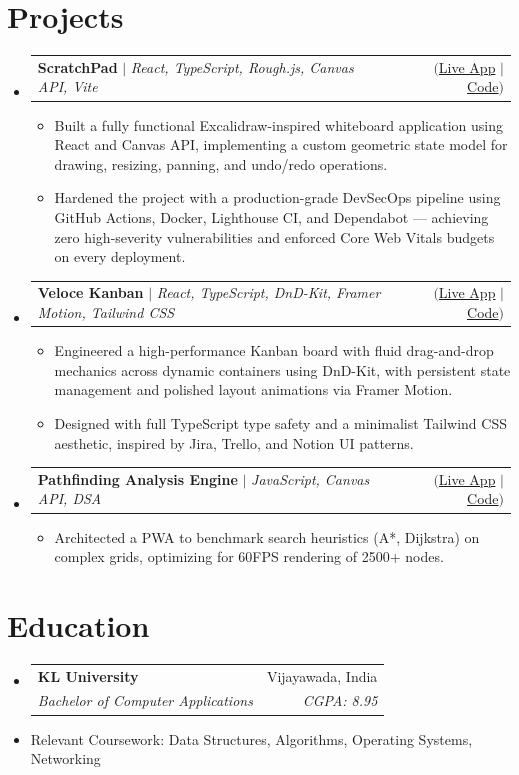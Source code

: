 \documentclass[letterpaper,11pt]{article}
\makeatletter
\newcommand{\resumeItem}[1]{
  \item\small{
    {#1 \vspace{-2pt}}
  }
}
\newcommand{\resumeSubheading}[4]{
  \vspace{-2pt}\item
    \begin{tabular*}{0.97\textwidth}[t]{l@{\extracolsep{\fill}}r}
      \textbf{#1} & #2 \\
      \textit{\small#3} & \textit{\small #4} \\
    \end{tabular*}\vspace{-7pt}
}
\newcommand{\resumeProjectHeading}[2]{
    \item
    \begin{tabular*}{0.97\textwidth}{l@{\extracolsep{\fill}}r}
      \small#1 & #2 \\
    \end{tabular*}\vspace{-7pt}
}
\newcommand{\resumeSubHeadingListStart}{\begin{itemize}[leftmargin=0.15in, label={}]}
\newcommand{\resumeSubHeadingListEnd}{\end{itemize}}
\newcommand{\resumeItemListStart}{\begin{itemize}}
\newcommand{\resumeItemListEnd}{\end{itemize}\vspace{-5pt}}
\makeatother
\begin{document}
\section{Projects}
    \resumeSubHeadingListStart
      \resumeProjectHeading
          {\textbf{ScratchPad} $|$ \emph{React, TypeScript, Rough.js, Canvas API, Vite}}{$(${\href{https://scratchpad.yeshwanth.online}{Live App}} $|$ {\href{https://github.com/yeshwanth-kr/scratchpad}{Code}}$)$}
          \resumeItemListStart
            \resumeItem{Built a fully functional Excalidraw-inspired whiteboard application using React and Canvas API, implementing a custom geometric state model for drawing, resizing, panning, and undo/redo operations.}
            \resumeItem{Hardened the project with a production-grade DevSecOps pipeline using GitHub Actions, Docker, Lighthouse CI, and Dependabot — achieving zero high-severity vulnerabilities and enforced Core Web Vitals budgets on every deployment.}
          \resumeItemListEnd
      \resumeProjectHeading
          {\textbf{Veloce Kanban} $|$ \emph{React, TypeScript, DnD-Kit, Framer Motion, Tailwind CSS}}{$(${\href{https://veloce.yeshwanth.online}{Live App}} $|$ {\href{https://github.com/Yeshwanth-kr/veloce-kanban}{Code}}$)$}
          \resumeItemListStart
            \resumeItem{Engineered a high-performance Kanban board with fluid drag-and-drop mechanics across dynamic containers using DnD-Kit, with persistent state management and polished layout animations via Framer Motion.}
            \resumeItem{Designed with full TypeScript type safety and a minimalist Tailwind CSS aesthetic, inspired by Jira, Trello, and Notion UI patterns.}
          \resumeItemListEnd
      \resumeProjectHeading
          {\textbf{Pathfinding Analysis Engine} $|$ \emph{JavaScript, Canvas API, DSA}}{$(${\href{https://visualize.yeshwanth.online}{Live App}} $|$ {\href{https://github.com/Yeshwanth-kr/pathfinding-visualizer-pwa}{Code}}$)$}
          \resumeItemListStart
            \resumeItem{Architected a PWA to benchmark search heuristics (A*, Dijkstra) on complex grids, optimizing for 60FPS rendering of 2500+ nodes.}
          \resumeItemListEnd
    \resumeSubHeadingListEnd


\section{Education}
  \resumeSubHeadingListStart
    \resumeSubheading
      {KL University}{Vijayawada, India}
      {Bachelor of Computer Applications}{CGPA: 8.95}
      \resumeItem{Relevant Coursework: Data Structures, Algorithms, Operating Systems, Networking}
  \resumeSubHeadingListEnd


\end{document}
